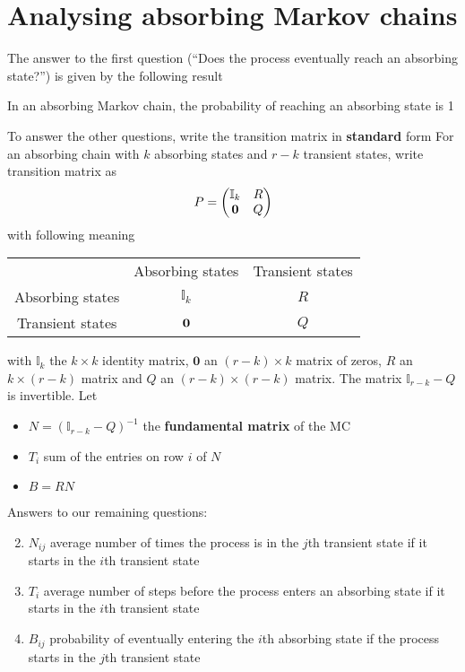 \documentclass[aspectratio=169]{beamer}\usepackage[]{graphicx}\usepackage[]{xcolor}
\begin{document}
\section{Analysing absorbing Markov chains}

\begin{frame}
The answer to the first question (``Does the process eventually reach an absorbing state?'') is given by the following result
\vfill
\begin{theorem}
In an absorbing Markov chain, the probability of reaching an absorbing state is 1
\end{theorem}
\end{frame}

\begin{frame}
To answer the other questions, write the transition matrix in \textbf{standard} form
\vfill
For an absorbing chain with $k$ absorbing states and $r-k$ transient states, write transition matrix as
\[
P=\begin{pmatrix}
\mathbb{I}_k & R \\
\b0 & Q
\end{pmatrix}
\]
with following meaning
\begin{center}\footnotesize
\begin{tabular}{ccc}
& Absorbing states & Transient states \\
Absorbing states & $\mathbb{I}_k$ & $R$ \\
Transient states & $\b0$ & $Q$
\end{tabular}
\end{center}
with $\mathbb{I}_k$ the $k\times k$ identity matrix, $\mathbf{0}$ an $(r-k)\times k$ matrix of zeros, $R$ an $k\times (r-k)$ matrix and $Q$ an $(r-k)\times(r-k)$ matrix.
The matrix $\mathbb{I}_{r-k}-Q$ is invertible. Let
\begin{itemize}
\item $N=(\mathbb{I}_{r-k}-Q)^{-1}$ the \textbf{fundamental matrix} of the MC
\item $T_i$ sum of the entries on row $i$ of $N$
\item $B=RN$
\end{itemize}
\end{frame}

\begin{frame}
Answers to our remaining questions:
\vfill
\begin{enumerate}
\setcounter{enumi}{1}
\item $N_{ij}$ average number of times the process is in the $j$th transient state if it starts in the $i$th transient state
\vfill
\item $T_i$ average number of steps before the process enters an absorbing state if it starts in the $i$th transient state
\vfill
\item $B_{ij}$ probability of eventually entering the $i$th absorbing state if the process starts in the $j$th transient state
\end{enumerate}
\vfill
\end{frame}
\end{document}
